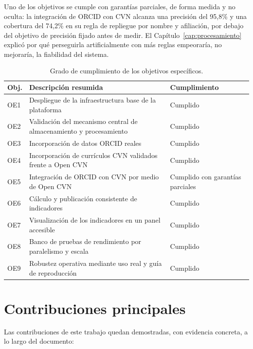 Uno de los objetivos se cumple con garantías parciales, de forma medida y
no oculta: la integración de ORCID con CVN alcanza una precisión del
95,8\% y una cobertura del 74,2\% en su regla de repliegue por nombre y
afiliación, por debajo del objetivo de precisión fijado antes de medir. El
Capítulo~\ref{cap:procesamiento} explicó por qué perseguirla
artificialmente con más reglas empeoraría, no mejoraría, la fiabilidad del
sistema.

\begin{table}[H]
  \centering
  \small
  \renewcommand{\arraystretch}{1.1}
  \begin{tabular}{
    p{}
    >{\raggedright\arraybackslash}p{}
    p{}}
    \hline
    \textbf{Obj.} & \textbf{Descripción resumida} & \textbf{Cumplimiento} \\
    \hline
    OE1 & Despliegue de la infraestructura base de la plataforma & Cumplido \\
    OE2 & Validación del mecanismo central de almacenamiento y procesamiento & Cumplido \\
    OE3 & Incorporación de datos ORCID reales & Cumplido \\
    OE4 & Incorporación de currículos CVN validados frente a Open CVN & Cumplido \\
    OE5 & Integración de ORCID con CVN por medio de Open CVN & Cumplido con garantías parciales \\
    OE6 & Cálculo y publicación consistente de indicadores & Cumplido \\
    OE7 & Visualización de los indicadores en un panel accesible & Cumplido \\
    OE8 & Banco de pruebas de rendimiento por paralelismo y escala & Cumplido \\
    OE9 & Robustez operativa mediante uso real y guía de reproducción & Cumplido \\
    \hline
  \end{tabular}
  \caption{Grado de cumplimiento de los objetivos específicos.}
  \label{tab:tfm_conclusiones_objetivos}
\end{table}

\section{Contribuciones principales}
\label{sec:conclusiones_contribuciones}

Las contribuciones de este trabajo quedan demostradas, con evidencia
concreta, a lo largo del documento:

